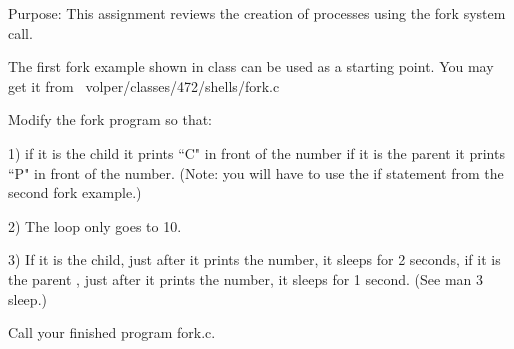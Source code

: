 

\parindent 0pt

Purpose: This assignment reviews the creation of processes using
the fork system call.

The first fork example shown in class can be used as a starting point.
You may get it from 
\hfill\break
{\ltt{}~volper/classes/472/shells/fork.c}

Modify the fork program so that:

1) if it is the child it prints ``C" in front of the number
if it is the parent it prints ``P" in front of the number.
(Note: you will have to use the if statement from the second fork
example.)

2) The loop only goes to 10.

3) If it is the child, just after it prints the number, it sleeps for 2 seconds,
if it is the parent , just after it prints the number, it sleeps for 1 second.
(See {\ltt{}man 3 sleep}.)

Call your finished program {\ltt{}fork.c}.

\bye
